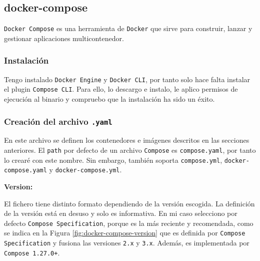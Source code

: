 

\subsection{docker-compose}
\par \texttt{Docker Compose} es una herramienta de \texttt{Docker} 
que sirve para construir, lanzar y gestionar
aplicaciones multicontenedor.

\subsubsection{Instalación}
\par Tengo instalado \texttt{Docker Engine} y \texttt{Docker CLI}, por tanto solo 
hace falta instalar el plugin \texttt{Compose CLI}. Para ello, 
lo descargo e instalo, le aplico permisos de ejecución 
al binario y compruebo que la instalación ha sido un éxito. 

\subsubsection{Creación del archivo \texttt{.yaml}}
\par En este archivo se definen los contenedores e imágenes
descritos en las secciones anteriores. 
El \texttt{path} por defecto de un archivo \texttt{Compose}
es \texttt{compose.yaml}, por tanto lo crearé con este nombre. Sin embargo,
también soporta \texttt{compose.yml}, \texttt{docker-compose.yaml} y 
\texttt{docker-compose.yml}.


\par \textbf{Version:}
\par El fichero tiene distinto formato dependiendo de la versión
escogida. La definición de la versión está en desuso y solo es informativa. En mi caso selecciono por defecto \texttt{Compose Specification}, porque es la más reciente 
y recomendada, como se indica en la Figura \ref{fig:docker-compose-version} que es definida por \texttt{Compose Specification}
y fusiona las versiones \texttt{2.x} y \texttt{3.x}. Además, es implementada por \texttt{Compose 1.27.0+}.

